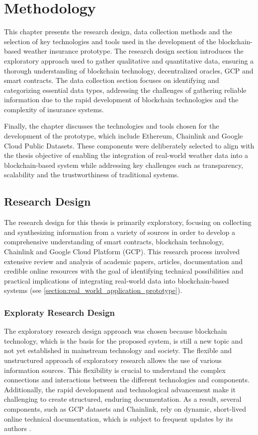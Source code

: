 \chapter{Methodology}\label{chapter:methodology}
This chapter presents the research design, data collection methods and the selection of key technologies and tools used in the development of the blockchain-based weather insurance prototype. The research design section introduces the exploratory approach used to gather qualitative and quantitative data, ensuring a thorough understanding of blockchain technology, decentralized oracles, GCP and smart contracts. The data collection section focuses on identifying and categorizing essential data types, addressing the challenges of gathering reliable information due to the rapid development of blockchain technologies and the complexity of insurance systems.

Finally, the chapter discusses the technologies and tools chosen for the development of the prototype, which include Ethereum, Chainlink and Google Cloud Public Datasets. These components were deliberately selected to align with the thesis objective of enabling the integration of real-world weather data into a blockchain-based system while addressing key challenges such as transparency, scalability and the trustworthiness of traditional systems.

\section{Research Design}\label{section:research_design}
The research design for this thesis is primarily exploratory, focusing on collecting and synthesizing information from a variety of sources in order to develop a comprehensive understanding of smart contracts, blockchain technology, Chainlink and Google Cloud Platform (GCP). This research process involved extensive review and analysis of academic papers, articles, documentation and credible online resources with the goal of identifying technical possibilities and practical implications of integrating real-world data into blockchain-based systems (see \cref{section:real_world_application_prototype}).

\subsection{Exploraty Research Design}
The exploratory research design approach was chosen because blockchain technology, which is the basis for the proposed system, is still a new topic and not yet established in mainstream technology and society. The flexible and unstructured approach of exploratory research allows the use of various information sources. This flexibility is crucial to understand the complex connections and interactions between the different technologies and components. Additionally, the rapid development and technological advancement make it challenging to create structured, enduring documentation. As a result, several components, such as GCP datasets and Chainlink, rely on dynamic, short-lived online technical documentation, which is subject to frequent updates by its authors \autocite{kicsi2022exploratory}.


